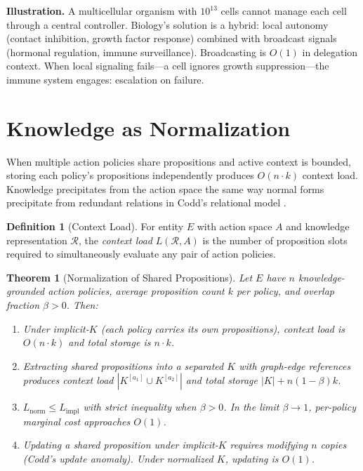 \documentclass[11pt]{article}
\newtheorem{theorem}{Theorem}
\theoremstyle{definition}
\newtheorem{definition}{Definition}
\theoremstyle{remark}
\begin{document}
\textbf{Illustration.} A multicellular organism with $10^{13}$ cells
cannot manage each cell through a central controller. Biology's solution
is a hybrid: local autonomy (contact inhibition, growth factor
response) combined with broadcast signals (hormonal regulation, immune
surveillance). Broadcasting is $O(1)$ in delegation context. When
local signaling fails---a cell ignores growth suppression---the immune
system engages: escalation on failure.

\section{Knowledge as Normalization}
\label{sec:normalization}

When multiple action policies share propositions and active context is
bounded, storing each policy's propositions independently produces
$O(n \cdot k)$ context load. Knowledge precipitates from the action
space the same way normal forms precipitate from redundant relations in
Codd's relational model \cite{Codd1970}.

\begin{definition}[Context Load]
\label{def:load}
For entity $E$ with action space $A$ and knowledge representation
$\mathcal{R}$, the \emph{context load} $L(\mathcal{R}, A)$ is the
number of proposition slots required to simultaneously evaluate any
pair of action policies.
\end{definition}

\begin{theorem}[Normalization of Shared Propositions]
\label{thm:normalization}
Let $E$ have $n$ knowledge-grounded action policies, average
proposition count $k$ per policy, and overlap fraction $\beta > 0$.
Then:
\begin{enumerate}
\item[(N1)] Under implicit-$K$ (each policy carries its own
   propositions), context load is $O(n \cdot k)$ and total storage
   is $n \cdot k$.
\item[(N2)] Extracting shared propositions into a separated $K$ with
   graph-edge references produces context load
   $|K^{[a_1]} \cup K^{[a_2]}|$ and total storage $|K| + n(1-\beta)k$.
\item[(N3)] $L_{\text{norm}} \leq L_{\text{impl}}$ with strict
   inequality when $\beta > 0$. In the limit $\beta \to 1$,
   per-policy marginal cost approaches $O(1)$.
\item[(N4)] Updating a shared proposition under implicit-$K$ requires
   modifying $n$ copies (Codd's update anomaly). Under normalized $K$,
   updating is $O(1)$.
\end{enumerate}
\end{theorem}
\end{document}
